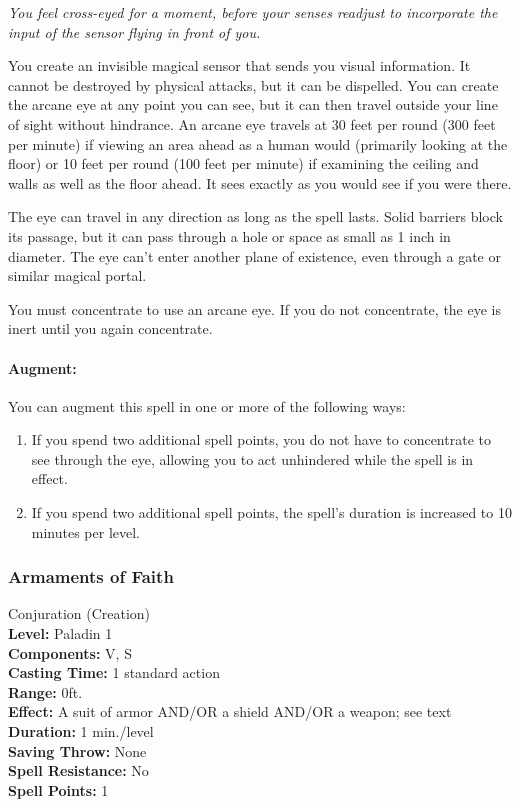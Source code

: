 \emph{You feel cross-eyed for a moment, before your senses readjust to incorporate the input of the sensor flying in front of you.}

You create an invisible magical sensor that sends you visual information. 
It cannot be destroyed by physical attacks, but it can be dispelled.
You can create the arcane eye at any point you can see, but it can then travel outside your line of sight without hindrance. 
An arcane eye travels at 30 feet per round (300 feet per minute) 
if viewing an area ahead as a human would (primarily looking at the floor) 
or 10 feet per round (100 feet per minute) if examining the ceiling and walls as well as the floor ahead. 
It sees exactly as you would see if you were there.

The eye can travel in any direction as long as the spell lasts. 
Solid barriers block its passage, but it can pass through a hole or space as small as 1 inch in diameter. 
The eye can't enter another plane of existence, even through a gate or similar magical portal.

You must concentrate to use an arcane eye. If you do not concentrate, the eye is inert until you again concentrate.

\paragraph{Augment:} You can augment this spell in one or more of the following ways:
\begin{enumerate}
 \item If you spend two additional spell points, you do not have to concentrate to see through the
 eye, allowing you to act unhindered while the spell is in effect.
 \item If you spend two additional spell points, the spell's duration is increased to 10 minutes per level.
\end{enumerate}
\subsubsection{Armaments of Faith}
\label{Spell:ArmamentsOfFaith}
Conjuration (Creation)
\\ \textbf{Level:} Paladin 1
\\ \textbf{Components:} V, S
\\ \textbf{Casting Time:} 1 standard action
\\ \textbf{Range:} 0ft.
\\ \textbf{Effect:} A suit of armor AND/OR a shield AND/OR a weapon; see text
\\ \textbf{Duration:} 1 min./level
\\ \textbf{Saving Throw:} None
\\ \textbf{Spell Resistance:} No
\\ \textbf{Spell Points:} 1

